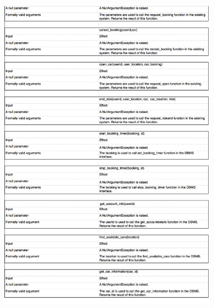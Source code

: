 \documentclass[a4paper,10pt]{article}
\begin{document}
    \begin{figure}[!h]
  \centering
    \includegraphics[scale=0.26]{Resources/7.png}
  \end{figure}
\end{document}
